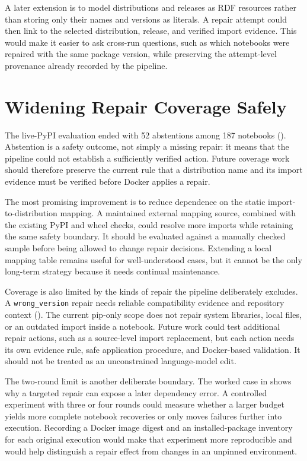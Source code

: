 A later extension is to model distributions and releases as RDF resources rather
than storing only their names and versions as literals. A repair attempt could
then link to the selected distribution, release, and verified import evidence.
This would make it easier to ask cross-run questions, such as which notebooks
were repaired with the same package version, while preserving the attempt-level
provenance already recorded by the pipeline.

\section{Widening Repair Coverage Safely}
\label{sec:fw-coverage}

The live-PyPI evaluation ended with 52 abstentions among 187 notebooks
(). Abstention is a safety outcome, not simply a
missing repair: it means that the pipeline could not establish a sufficiently
verified action. Future coverage work should therefore preserve the current
rule that a distribution name and its import evidence must be verified before
Docker applies a repair.

The most promising improvement is to reduce dependence on the static
import-to-distribution mapping. A maintained external mapping source, combined
with the existing PyPI and wheel checks, could resolve more imports while
retaining the same safety boundary. It should be evaluated against a manually
checked sample before being allowed to change repair decisions. Extending a
local mapping table remains useful for well-understood cases, but it cannot be
the only long-term strategy because it needs continual maintenance.

Coverage is also limited by the kinds of repair the pipeline deliberately
excludes. A \texttt{wrong\_version} repair needs reliable compatibility evidence
and repository context (). The current pip-only scope
does not repair system libraries, local files, or an outdated import inside a
notebook. Future work could test additional repair actions, such as a
source-level import replacement, but each action needs its own evidence rule,
safe application procedure, and Docker-based validation. It should not be
treated as an unconstrained language-model edit.

The two-round limit is another deliberate boundary. The worked case in
 shows why a targeted repair can expose a later
dependency error. A controlled experiment with three or four rounds could
measure whether a larger budget yields more complete notebook recoveries or
only moves failures further into execution. Recording a Docker image digest and
an installed-package inventory for each original execution would make that
experiment more reproducible and would help distinguish a repair effect from
changes in an unpinned environment.

